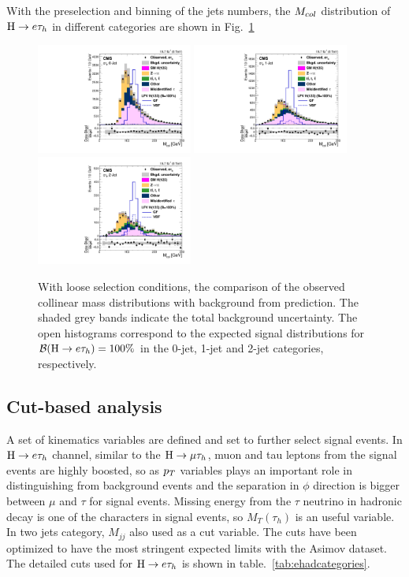 With the preselection and binning of the jets numbers, the $M_{col}$ distribution of $\mathrm{H} \to e \tau_{h}$ in different categories are shown in Fig.~\ref{fig:etauCol_preselection}
\begin{figure}[hbtp]\centering
 \includegraphics[width=0.4565\textwidth]{chapter5/etauPlots/etau_preselection0jet.pdf}
 \includegraphics[width=0.4565\textwidth]{chapter5/etauPlots/etau_preselection1jet.pdf}
 \includegraphics[width=0.4565\textwidth]{chapter5/etauPlots/etau_preselection2jet.pdf}
 \caption{With loose selection conditions, the comparison of the observed collinear mass distributions with background from prediction. The shaded grey bands indicate the total background uncertainty.
The open histograms correspond to the expected signal distributions for $\mathcal{B}(\mathrm{H} \to e \tau_{h})=100\%$ in the  0-jet, 1-jet and 2-jet categories, respectively.}
\label{fig:etauCol_preselection}\end{figure}


\subsection{Cut-based analysis}
A set of kinematics variables are defined and set to further select signal events. In $\mathrm{H} \to e \tau_{h}$ channel, similar to the $\mathrm{H}\to \mu\tau_{h}$, muon and tau leptons from the signal events are highly boosted, so as $p_{T}$ variables plays an important role in distinguishing from background events and the separation in $\phi$ direction is bigger between $\mu$ and $\tau$ for signal events. Missing energy from the $\tau$ neutrino in hadronic decay is one of the characters in signal events, so $M_{T}(\tau_{h})$ is an useful variable. In two jets category, $M_{jj}$ also used as a cut variable.  The cuts have been optimized to have the most stringent expected limits with the Asimov dataset. The detailed cuts used for $\mathrm{H} \to e \tau_{h}$ is shown in table.~\ref{tab:ehadcategories}.


